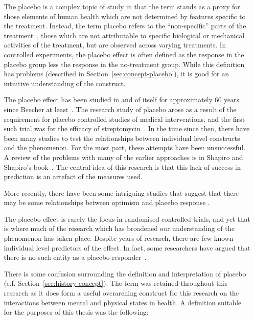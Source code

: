 The placebo is a complex topic of study in that the term stands as a proxy for those elements of human health which are not determined by  features specific to the treatment. Instead, the term placebo refers to the ``non-specific'' parts of the treatment~\cite{grunbaum1981placebo}, those which are not attributable to  specific biological or mechanical activities of the treatment, but are observed across varying treatments. In controlled experiments, the placebo effect is often defined as the response in the placebo group less the response in the no-treatment group. While this definition has problems (described in Section~\ref{sec:concept-placebo}), it is good for an intuitive understanding of the construct. 

The placebo effect has been studied in and of itself for approximately 60 years since Beecher at least~\cite{beecher1955powerful}. The research study of placebo arose as a result of the requirement for placebo controlled studies of medical interventions, and the first such trial was for the efficacy of streptomycin~\cite{concato2000randomized}. In the time since then, there have been many studies to test the relationships between individual level constructs and the phenomenon. For the most part, these attempts have been unsuccessful. A review of the problems with many of the earlier approaches is in Shapiro and Shapiro's book~\cite{Shapiro1997}.  The central idea of this research is that this lack of success in prediction is an artefact of the measures used. 

More recently, there have been some intriguing studies that suggest that there may be some relationships between optimism and placebo response \cite{Geers2005,morton2009reproducibility}.

The placebo effect is rarely the focus in randomised controlled trials, and yet that is where much of the research which has broadened our understanding of the phenomenon has taken place.
Despite years of research, there are few known individual level predictors of the effect. In fact, some researchers have argued that there is no such entity as a placebo responder~\cite{Kaptchuk2008a}. 


There is some confusion surrounding the definition and interpretation of placebo (c.f. Section~\ref{sec:history-concept}).  The term was retained throughout this research  as it does form a useful overarching construct for this research on the interactions between mental and physical states in health. A definition suitable for the purposes of this thesis was the following:

